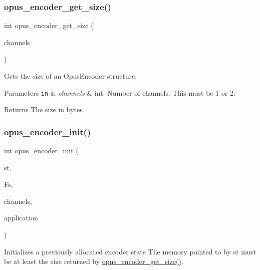 \subsubsection{\texorpdfstring{opus\+\_\+encoder\+\_\+get\+\_\+size()}{opus\_encoder\_get\_size()}}
{\footnotesize\ttfamily int opus\+\_\+encoder\+\_\+get\+\_\+size (\begin{DoxyParamCaption}\item[{int}]{channels }\end{DoxyParamCaption})}



Gets the size of an {\ttfamily Opus\+Encoder} structure. 


\begin{DoxyParams}[1]{Parameters}
\mbox{\tt in}  & {\em channels} & {\ttfamily int}\+: Number of channels. This must be 1 or 2. \\
\hline
\end{DoxyParams}
\begin{DoxyReturn}{Returns}
The size in bytes. 
\end{DoxyReturn}
\mbox{\label{group__opus__encoder_ga515db1c267a7421dacaad3610f79eb79}} 
\subsubsection{\texorpdfstring{opus\+\_\+encoder\+\_\+init()}{opus\_encoder\_init()}}
{\footnotesize\ttfamily int opus\+\_\+encoder\+\_\+init (\begin{DoxyParamCaption}\item[{\hyperlink{group__opus__encoder_gaf461a3ef2f10c2fe8b994a176f06c9bd}{Opus\+Encoder} $\ast$}]{st,  }\item[{\hyperlink{opus__types_8h_aa4d309d6f80b99dbabebc8f98879ab9a}{opus\+\_\+int32}}]{Fs,  }\item[{int}]{channels,  }\item[{int}]{application }\end{DoxyParamCaption})}



Initializes a previously allocated encoder state The memory pointed to by st must be at least the size returned by \hyperlink{group__opus__encoder_gaefeb7dc1d6e3b59dea5ea674c86e9c18}{opus\+\_\+encoder\+\_\+get\+\_\+size()}. 

